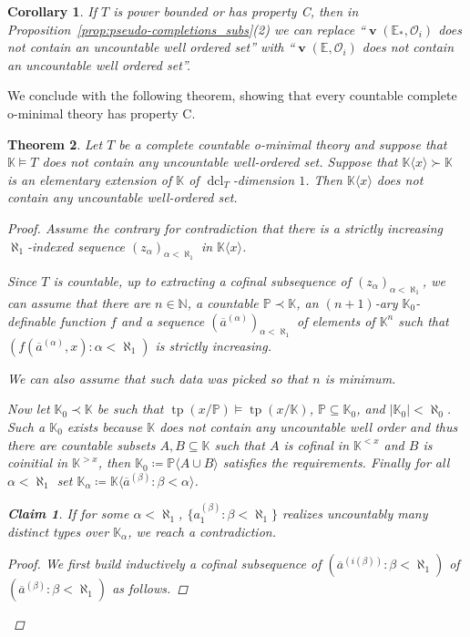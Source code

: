 \documentclass{amsart}
\newtheorem{theorem}{Theorem}
\newtheorem{corollary}[theorem]{Corollary}
\newtheorem{claim}{Claim}[theorem]
\theoremstyle{remark}
\theoremstyle{definition}
\theoremstyle{plain}
\newcommand{\bE}{\mathbb E}
\newcommand{\bK}{\mathbb K}
\newcommand{\bN}{\mathbb N}
\newcommand{\bP}{\mathbb P}
\newcommand{\cO}{\mathcal O}
\DeclareMathOperator{\val}{\mathbf{v}}
\DeclareMathOperator{\tp}{\mathrm{tp}}
\DeclareMathOperator{\dcl}{\mathrm{dcl}}
\theoremstyle{plain}
\begin{document}
\begin{corollary}
    If $T$ is power bounded or has property C, then in Proposition~\ref{prop:pseudo-completions_subs}(2) we can replace ``$\val(\bE_*, \cO_i)$ does not contain an uncountable well ordered set'' with ``$\val(\bE, \cO_i)$ does not contain an uncountable well ordered set''.
\end{corollary}

We conclude with the following theorem, showing that every countable complete o-minimal theory has property C.

\begin{theorem}
    Let $T$ be a complete \emph{countable} o-minimal theory and suppose that $\bK\models T$ does not contain any uncountable well-ordered set. Suppose that $\bK\langle x \rangle\succ \bK$ is an elementary extension of $\bK$ of $\dcl_T$-dimension $1$. Then $\bK \langle x \rangle$ does not contain any uncountable well-ordered set.
    \begin{proof}
        Assume the contrary for contradiction that there is a strictly increasing $\aleph_1$-indexed sequence $(z_\alpha)_{\alpha<\aleph_1}$ in $\bK \langle x\rangle$.

        Since $T$ is countable, up to extracting a cofinal subsequence of $(z_\alpha)_{\alpha<\aleph_1}$, we can assume that there are $n \in \bN$, a countable $\bP\prec \bK$, an $(n+1)$-ary $\bK_0$-definable function $f$ and a sequence $(\overline{a}^{(\alpha)})_{\alpha<\aleph_1}$ of elements of $\bK^n$ such that $(f(\overline{a}^{(\alpha)}, x): \alpha<\aleph_1)$ is strictly increasing.

        We can also assume that such data was picked so that $n$ is minimum.

        Now let $\bK_0 \prec \bK$ be such that $\tp(x/\bP)\models \tp(x/\bK)$, $\bP \subseteq \bK_0$, and $|\bK_0|<\aleph_0$. Such a $\bK_0$ exists because $\bK$ does not contain any uncountable well order and thus there are countable subsets $A, B\subseteq \bK$ such that $A$ is cofinal in $\bK^{<x}$ and $B$ is coinitial in $\bK^{>x}$, then $\bK_0\coloneqq \bP\langle A\cup B\rangle$ satisfies the requirements. Finally for all $\alpha< \aleph_1$ set $\bK_\alpha \coloneqq \bK \langle \overline{a}^{(\beta)}: \beta < \alpha\rangle$.

        \begin{claim}
            If for some $\alpha <\aleph_1$, $\{a_1^{(\beta)}: \beta < \aleph_1\}$ realizes uncountably many distinct types over $\bK_\alpha$, we reach a contradiction.
            \begin{proof}
                We first build inductively a cofinal subsequence of $(\overline{a}^{(i(\beta))}: \beta <\aleph_1)$ of $(\overline{a}^{(\beta)}: \beta <\aleph_1)$ as follows.


\end{proof}
\end{claim}
\end{proof}
\end{theorem}
\end{document}
